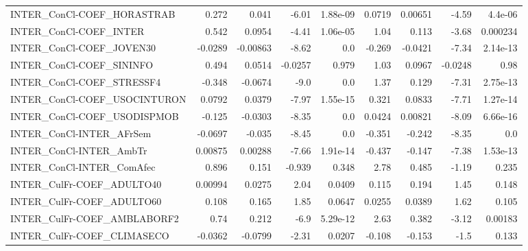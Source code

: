 \begin{tabular}{lrrrrrrrr}
INTER\_ConCl-COEF\_HORASTRAB             &       0.272 &        0.041 &   -6.01 & 1.88e-09 &     0.0719 &     0.00651 &        -4.59 &       4.4e-06 \\
INTER\_ConCl-COEF\_INTER                 &       0.542 &       0.0954 &   -4.41 & 1.06e-05 &       1.04 &       0.113 &        -3.68 &      0.000234 \\
INTER\_ConCl-COEF\_JOVEN30               &     -0.0289 &     -0.00863 &   -8.62 &      0.0 &     -0.269 &     -0.0421 &        -7.34 &      2.14e-13 \\
INTER\_ConCl-COEF\_SININFO               &       0.494 &       0.0514 & -0.0257 &    0.979 &       1.03 &      0.0967 &      -0.0248 &          0.98 \\
INTER\_ConCl-COEF\_STRESSF4              &      -0.348 &      -0.0674 &    -9.0 &      0.0 &       1.37 &       0.129 &        -7.31 &      2.75e-13 \\
INTER\_ConCl-COEF\_USOCINTURON           &      0.0792 &       0.0379 &   -7.97 & 1.55e-15 &      0.321 &      0.0833 &        -7.71 &      1.27e-14 \\
INTER\_ConCl-COEF\_USODISPMOB            &      -0.125 &      -0.0303 &   -8.35 &      0.0 &     0.0424 &     0.00821 &        -8.09 &      6.66e-16 \\
INTER\_ConCl-INTER\_AFrSem               &     -0.0697 &       -0.035 &   -8.45 &      0.0 &     -0.351 &      -0.242 &        -8.35 &           0.0 \\
INTER\_ConCl-INTER\_AmbTr                &     0.00875 &      0.00288 &   -7.66 & 1.91e-14 &     -0.437 &      -0.147 &        -7.38 &      1.53e-13 \\
INTER\_ConCl-INTER\_ComAfec              &       0.896 &        0.151 &  -0.939 &    0.348 &       2.78 &       0.485 &        -1.19 &         0.235 \\
INTER\_CulFr-COEF\_ADULTO40              &     0.00994 &       0.0275 &    2.04 &   0.0409 &      0.115 &       0.194 &         1.45 &         0.148 \\
INTER\_CulFr-COEF\_ADULTO60              &       0.108 &        0.165 &    1.85 &   0.0647 &     0.0255 &      0.0389 &         1.62 &         0.105 \\
INTER\_CulFr-COEF\_AMBLABORF2            &        0.74 &        0.212 &    -6.9 & 5.29e-12 &       2.63 &       0.382 &        -3.12 &       0.00183 \\
INTER\_CulFr-COEF\_CLIMASECO             &     -0.0362 &      -0.0799 &   -2.31 &   0.0207 &     -0.108 &      -0.153 &         -1.5 &         0.133 \\

\end{tabular}
